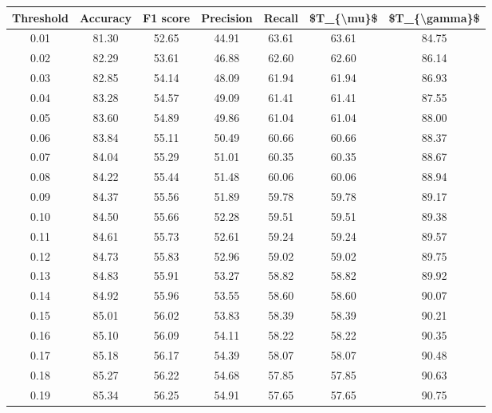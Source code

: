 \begin{tabular}{|c|c|c|c|c|c|c|}
\hline
 Threshold &  Accuracy &  F1 score &  Precision &  Recall &  \$T\_\{\textbackslash mu\}\$ &  \$T\_\{\textbackslash gamma\}\$ \\
\hline
      0.01 &     81.30 &     52.65 &      44.91 &   63.61 &      63.61 &         84.75 \\
      0.02 &     82.29 &     53.61 &      46.88 &   62.60 &      62.60 &         86.14 \\
      0.03 &     82.85 &     54.14 &      48.09 &   61.94 &      61.94 &         86.93 \\
      0.04 &     83.28 &     54.57 &      49.09 &   61.41 &      61.41 &         87.55 \\
      0.05 &     83.60 &     54.89 &      49.86 &   61.04 &      61.04 &         88.00 \\
      0.06 &     83.84 &     55.11 &      50.49 &   60.66 &      60.66 &         88.37 \\
      0.07 &     84.04 &     55.29 &      51.01 &   60.35 &      60.35 &         88.67 \\
      0.08 &     84.22 &     55.44 &      51.48 &   60.06 &      60.06 &         88.94 \\
      0.09 &     84.37 &     55.56 &      51.89 &   59.78 &      59.78 &         89.17 \\
      0.10 &     84.50 &     55.66 &      52.28 &   59.51 &      59.51 &         89.38 \\
      0.11 &     84.61 &     55.73 &      52.61 &   59.24 &      59.24 &         89.57 \\
      0.12 &     84.73 &     55.83 &      52.96 &   59.02 &      59.02 &         89.75 \\
      0.13 &     84.83 &     55.91 &      53.27 &   58.82 &      58.82 &         89.92 \\
      0.14 &     84.92 &     55.96 &      53.55 &   58.60 &      58.60 &         90.07 \\
      0.15 &     85.01 &     56.02 &      53.83 &   58.39 &      58.39 &         90.21 \\
      0.16 &     85.10 &     56.09 &      54.11 &   58.22 &      58.22 &         90.35 \\
      0.17 &     85.18 &     56.17 &      54.39 &   58.07 &      58.07 &         90.48 \\
      0.18 &     85.27 &     56.22 &      54.68 &   57.85 &      57.85 &         90.63 \\
      0.19 &     85.34 &     56.25 &      54.91 &   57.65 &      57.65 &         90.75 \\

\end{tabular}
